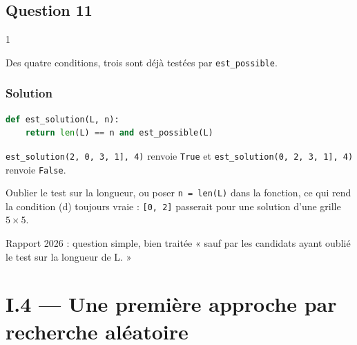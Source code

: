 \documentclass[11pt,a4paper]{article}
\begin{document}
\hypertarget{question-11}{%
\subsection{Question 11}\label{question-11}}

\begin{indication}{1}

Des quatre conditions, trois sont déjà testées par \texttt{est\_possible}.

\end{indication}

\hypertarget{solution-10}{%
\subsubsection{Solution}\label{solution-10}}

\begin{lstlisting}[language=Python]
def est_solution(L, n):
    return len(L) == n and est_possible(L)
\end{lstlisting}

\texttt{est\_solution(\allowbreak{}{[}2,\allowbreak{}\ 0,\allowbreak{}\ 3,\allowbreak{}\ 1{]}\allowbreak{},\allowbreak{}\ 4)\allowbreak{}} renvoie \texttt{True} et \texttt{est\_solution(\allowbreak{}{[}0,\allowbreak{}\ 2,\allowbreak{}\ 3,\allowbreak{}\ 1{]}\allowbreak{},\allowbreak{}\ 4)\allowbreak{}} renvoie \texttt{False}.

\begin{piege}

Oublier le test sur la longueur, ou poser \texttt{n\ =\ len(L)} dans la fonction, ce qui rend la condition (d) toujours vraie : \texttt{{[}0,\ 2{]}} passerait pour une solution d'une grille \(5 \times 5\).

\end{piege}

\begin{jury}

Rapport 2026 : question simple, bien traitée « sauf par les candidats ayant oublié le test sur la longueur de L. »

\end{jury}

\hypertarget{i.4-une-premiuxe8re-approche-par-recherche-aluxe9atoire}{%
\section{I.4 --- Une première approche par recherche aléatoire}\label{i.4-une-premiuxe8re-approche-par-recherche-aluxe9atoire}}
\end{document}
